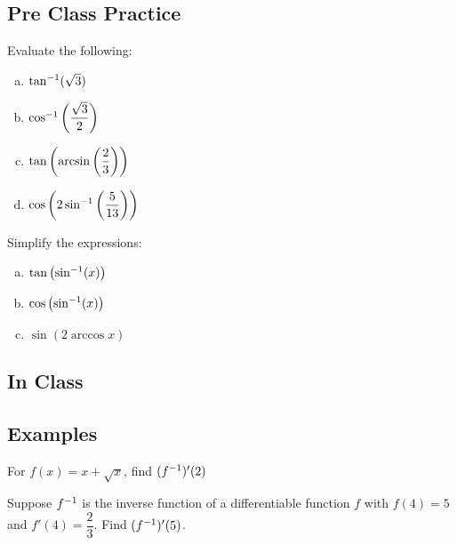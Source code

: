 \documentclass[notes]{subfiles}
\begin{document}
	\subsection*{Pre Class Practice}
		\begin{ex}
			Evaluate the following:
			\begin{enumerate}[(a)]
				\item \(\tan^{-1}(\sqrt{3})\)
					
				\item \(\cos^{-1}\left( \dfrac{\sqrt{3}}{2}\right)\)
					
				\item \(\tan\left( \arcsin\left( \dfrac{2}{3}\right)\right)\)
					
				\item \(\cos\left( 2\sin^{-1}\left( \dfrac{5}{13}\right)\right)\)
			\end{enumerate}
		\end{ex}	
		
		\begin{ex}
			Simplify the expressions:
			\begin{enumerate}[(a)]
				\item \(\tan \left( \sin^{-1}(x)\right)\)
					\vs{1}
					
				\item \(\cos\left( \sin^{-1}(x)\right)\)
					\vs{1}
					
				\item \(\sin (2\arccos x)\)
					\vs{1}
			\end{enumerate}	
		\end{ex}
		\newpage
			
		
	\subsection*{In Class}
		\subsection*{Examples}
		
		\begin{ex}
			For \(f(x) = x+\sqrt{x}\), find \((f^{-1})'(2)\)
		\end{ex}
			
		\begin{ex}
			Suppose \(f^{-1}\) is the inverse function of a differentiable function \(f\) with \(f(4) = 5\) and \(f'(4) = \dfrac{2}{3}\).  Find \((f^{-1})'(5)\).
		\end{ex}
			
\end{document}
